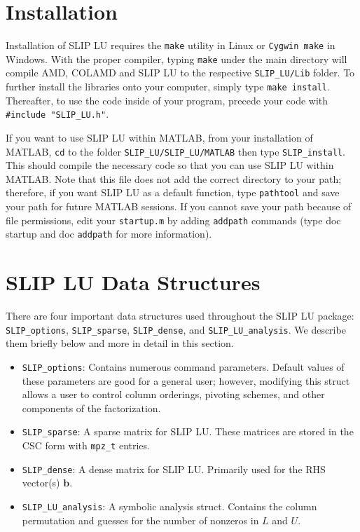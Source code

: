 \documentclass[12pt]{article}
\theoremstyle{definition}
\begin{document}
\section{Installation} \label{s:install}

Installation of SLIP LU requires the \verb|make| utility in Linux or
\verb|Cygwin make| in Windows. With the proper compiler, typing \verb|make|
under the main directory will compile AMD, COLAMD and SLIP LU to the respective
\verb'SLIP_LU/Lib' folder. To further install the libraries onto your computer,
simply type \verb|make install|.  Thereafter, to use the code inside of your
program, precede your code with \verb|#include "SLIP_LU.h"|.

If you want to use SLIP LU within MATLAB, from your installation of MATLAB,
\verb|cd| to the folder \verb|SLIP_LU/SLIP_LU/MATLAB| then type
\verb|SLIP_install|. This should compile the necessary code so that you can use
SLIP LU within MATLAB. Note that this file does not add the correct directory
to your path; therefore, if you want SLIP LU as a default function, type
\verb|pathtool| and save your path for future MATLAB sessions. If you cannot
save your path because of file permissions, edit your \verb|startup.m| by
adding \verb|addpath| commands (type doc startup and doc \verb|addpath| for
more information).

\section{SLIP LU Data Structures} \label{s:Structures}

There are four important data structures used throughout the SLIP LU package:
\verb|SLIP_options|, \verb|SLIP_sparse|, \verb|SLIP_dense|, and
\verb|SLIP_LU_analysis|. We describe them briefly below and more in detail in
this section.

\begin{itemize}
    \item \verb|SLIP_options|: Contains numerous command parameters. Default
    values of these parameters are good for a general user; however, modifying
    this struct allows a user to control column orderings, pivoting schemes,
    and other components of the factorization.

    \item \verb|SLIP_sparse|: A sparse matrix for SLIP LU. These matrices are
    stored in the CSC form with \verb|mpz_t| entries.

    \item \verb|SLIP_dense|: A dense matrix for SLIP LU. Primarily used for the
    RHS vector(s) $\mathbf{b}$.

    \item \verb|SLIP_LU_analysis|: A symbolic analysis struct. Contains the
    column permutation and guesses for the number of nonzeros in $L$ and $U$.
\end{itemize}
\end{document}
